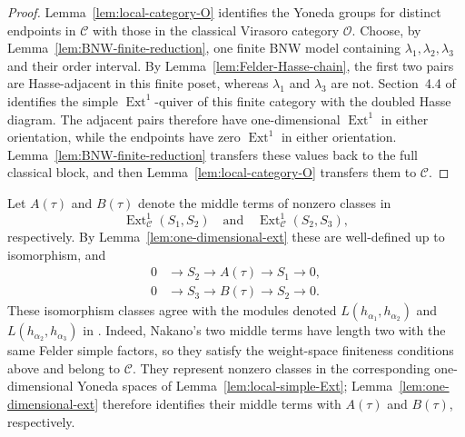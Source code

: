 \documentclass[12pt,leqno]{amsart}
\numberwithin{equation}{section}
\newcommand{\Ext}{\operatorname{Ext}}
\begin{document}
\begin{proof}
Lemma~\ref{lem:local-category-O} identifies the Yoneda groups for
distinct endpoints in $\mathscr C$ with those in the classical Virasoro
category $\mathcal O$.  Choose, by
Lemma~\ref{lem:BNW-finite-reduction}, one finite BNW model containing
$\lambda_1,\lambda_2,\lambda_3$ and their order interval.  By
Lemma~\ref{lem:Felder-Hasse-chain}, the first two pairs are Hasse-adjacent
in this finite poset, whereas $\lambda_1$ and $\lambda_3$ are not.
Section~4.4 of \cite{BoeNakanoWiesner} identifies the simple
$\Ext^1$-quiver of this finite category with the doubled Hasse diagram.
The adjacent pairs therefore have one-dimensional $\Ext^1$ in either
orientation, while the endpoints have zero $\Ext^1$ in either
orientation.  Lemma~\ref{lem:BNW-finite-reduction} transfers these values
back to the full classical block, and then
Lemma~\ref{lem:local-category-O} transfers them to $\mathscr C$.
\end{proof}

Let $A(\tau)$ and $B(\tau)$ denote the middle terms of nonzero classes
in
\[
 \Ext^1_{\mathscr C}(S_1,S_2)
 \quad\text{and}\quad
 \Ext^1_{\mathscr C}(S_2,S_3),
\]
respectively.  By Lemma~\ref{lem:one-dimensional-ext} these are
well-defined up to isomorphism, and
\begin{align}
 0&\longrightarrow S_2\longrightarrow A(\tau)
   \longrightarrow S_1\longrightarrow0,
   \label{eq:Nakano-tower-A}\\
 0&\longrightarrow S_3\longrightarrow B(\tau)
   \longrightarrow S_2\longrightarrow0.
   \label{eq:Nakano-tower-B}
\end{align}
These isomorphism classes agree with the modules denoted
$L(h_{\alpha_1},h_{\alpha_2})$ and
$L(h_{\alpha_2},h_{\alpha_3})$ in
\cite[Definition~5.9]{Nakano}.  Indeed, Nakano's two middle terms have
length two with the same Felder simple factors, so they satisfy the
weight-space finiteness conditions above and belong to $\mathscr C$.
They represent nonzero classes in the corresponding one-dimensional
Yoneda spaces of Lemma~\ref{lem:local-simple-Ext};
Lemma~\ref{lem:one-dimensional-ext} therefore identifies their middle
terms with $A(\tau)$ and $B(\tau)$, respectively.
\end{document}
